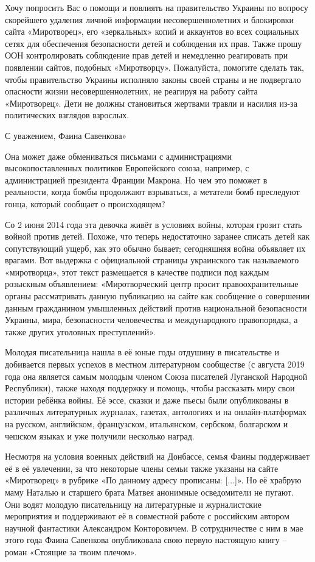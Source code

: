 Хочу попросить Вас о помощи и повлиять на правительство Украины по вопросу
скорейшего удаления личной информации несовершеннолетних и блокировки сайта
«Миротворец», его «зеркальных» копий и аккаунтов во всех социальных сетях для
обеспечения безопасности детей и соблюдения их прав. Также прошу ООН
контролировать соблюдение прав детей и немедленно реагировать при появлении
сайтов, подобных «Миротворцу». Пожалуйста, помогите сделать так, чтобы
правительство Украины исполняло законы своей страны и не подвергало опасности
жизни несовершеннолетних, не реагируя на работу сайта «Миротворец». Дети не
должны становиться жертвами травли и насилия из-за политических взглядов
взрослых.

С уважением, Фаина Савенкова»

Она может даже обмениваться письмами с администрациями высокопоставленных
политиков Европейского союза, например, с администрацией президента Франции
Макрона. Но чем это поможет в реальности, когда бомбы продолжают взрываться, а
метатели бомб преследуют гонца, который сообщает о происходящем?

Со 2 июня 2014 года эта девочка живёт в условиях войны, которая грозит стать
войной против детей. Похоже, что теперь недостаточно заранее списать детей как
сопутствующий ущерб, как это обычно бывает; сегодняшняя война объявляет их
врагами. Вот выдержка с официальной страницы украинского так называемого
«миротворца», этот текст размещается в качестве подписи под каждым розыскным
объявлением: «Миротворческий центр просит правоохранительные органы
рассматривать данную публикацию на сайте как сообщение о совершении данным
гражданином умышленных действий против национальной безопасности Украины, мира,
безопасности человечества и международного правопорядка, а также других
уголовных преступлений».

Молодая писательница нашла в её юные годы отдушину в писательстве и добивается
первых успехов в местном литературном сообществе (с августа 2019 года она
является самым молодым членом Союза писателей Луганской Народной Республики),
также находя поддержку и помощь, чтобы рассказать миру свои истории ребёнка
войны. Её эссе, сказки и даже пьесы были опубликованы в различных литературных
журналах, газетах, антологиях и на онлайн-платформах на русском, английском,
французском, итальянском, сербском, болгарском и чешском языках и уже получили
несколько наград.

Несмотря на условия военных действий на Донбассе, семья Фаины поддерживает её в
её увлечении, за что некоторые члены семьи также указаны на сайте «Миротворец»
в рубрике «По данному адресу прописаны: [...]». Но её храбрую маму Наталью и
старшего брата Матвея анонимные осведомители не пугают. Они водят молодую
писательницу на литературные и журналистские мероприятия и поддерживают её в
совместной работе с российским автором научной фантастики Александром
Конторовичем. В сотрудничестве с ним в мае этого года Фаина Савенкова
опубликовала свою первую настоящую книгу – роман «Стоящие за твоим плечом».

